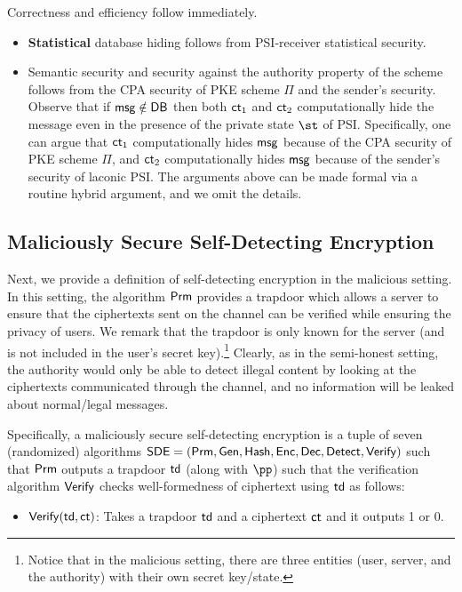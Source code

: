 Correctness and efficiency follow immediately. 
\begin{itemize}
	\item \textbf{Statistical} database hiding  follows  from  PSI-receiver statistical security.
	
	\item Semantic security and security against the authority property of the scheme follows from the CPA security of PKE scheme $\Pi$ and the sender's security. Observe that if $\mathsf{msg} \notin {\mathsf{DB}}$ then both $\mathsf{ct}_1$ and $\mathsf{ct}_2$ computationally hide the message even in the presence of the private state $\st$ of PSI. Specifically, one can argue that $\mathsf{ct}_1$ computationally hides $\mathsf{msg}$ because of the CPA security of PKE scheme $\Pi$, and $\mathsf{ct}_2$ computationally hides $\mathsf{msg}$ because of the sender's security of laconic PSI. The arguments above can be made formal via a routine hybrid argument, and we omit the details.
\end{itemize}


\subsection{Maliciously Secure Self-Detecting Encryption}
\label{subsec:malsde}


Next, we provide a definition of self-detecting encryption in the malicious setting. In this setting, the algorithm $\mathsf{Prm}$ provides a trapdoor which allows a server to ensure that the ciphertexts sent on the channel can be verified while ensuring the privacy of users. We remark that the trapdoor is only known for the server (and is not included in the user's secret key).\footnote{Notice that in the malicious setting, there are three entities (user, server, and the authority) with their own secret key/state.} Clearly, as in the semi-honest setting, the authority would only be able to detect illegal content by looking at the ciphertexts communicated through the channel, and no information will be leaked about normal/legal messages.

Specifically, a maliciously secure self-detecting encryption is a tuple of seven (randomized) algorithms ${\mathsf{SDE}} = (\mathsf{Prm}, \mathsf{Gen}, \mathsf{Hash}, \mathsf{Enc}, \mathsf{Dec}, {\mathsf{Detect}}, \mathsf{Verify})$ such that $\mathsf{Prm}$ outputs a trapdoor $\mathsf{td}$ (along with $\pp$) such that the verification algorithm $\mathsf{Verify}$ checks well-formedness of ciphertext using $\mathsf{td}$ as follows:

\begin{itemize}
	\item $\mathsf{Verify}(\mathsf{td}, \mathsf{ct})$: Takes a trapdoor $\mathsf{td}$ and a ciphertext $\mathsf{ct}$ and it outputs 1 or 0.
\end{itemize} 

